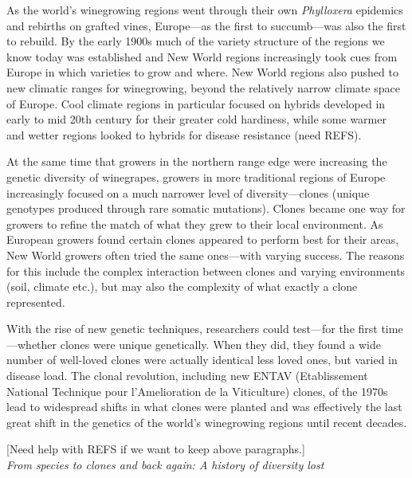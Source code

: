 \documentclass[11pt]{article}
\begin{document}
As the world's winegrowing regions went through their own \emph{Phylloxera} epidemics and rebirths on grafted vines, Europe---as the first to succumb---was also the first to rebuild. By the early 1900s much of the variety structure of the regions we know today was established and New World regions increasingly took cues from Europe in which varieties to grow and where. New World regions also pushed to new climatic ranges for winegrowing, beyond the relatively narrow climate space of Europe. Cool climate regions in particular focused on hybrids developed in early to mid 20th century for their greater cold hardiness, while some warmer and wetter regions looked to hybrids for disease resistance (need REFS). %

At the same time that growers in the northern range edge were increasing the genetic diversity of winegrapes, growers in more traditional regions of Europe increasingly focused on a much narrower level of diversity---clones (unique genotypes produced through rare somatic mutations). Clones became one way for growers to refine the match of what they grew to their local environment. As European growers found certain clones appeared to perform best for their areas, New World growers often tried the same ones---with varying success. The reasons for this include the complex interaction between clones and varying environments (soil, climate etc.), but may also the complexity of what exactly a clone represented. 

With the rise of new genetic techniques, researchers could test---for the first time---whether clones were unique genetically. When they did, they found a wide number of well-loved clones were actually identical less loved ones, but varied in disease load. The clonal revolution, including new ENTAV (Etablissement National Technique pour l’Amelioration de la Viticulture) clones, of the 1970s lead to widespread shifts in what clones were planted and was effectively the last great shift in the genetics of the world's winegrowing regions until recent decades.  %

[Need help with REFS if we want to keep above paragraphs.]\\

\emph{From species to clones and back again: A history of diversity lost}  %
\end{document}
